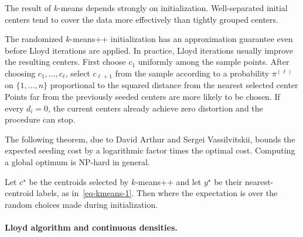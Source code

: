 The result of $k$-means depends strongly on initialization. Well-separated initial centers tend to cover the data more effectively than tightly grouped centers.

The randomized $k$-means++ initialization has an approximation guarantee even before Lloyd iterations are applied. In practice, Lloyd iterations usually improve the resulting centers. First choose $c_1$ uniformly among the sample points. After choosing $c_1,\ldots,c_\ell$, select $c_{\ell+1}$ from the sample according to a probability $\pi^{(\ell)}$ on $\{1,\ldots,n\}$ proportional to the squared distance from the nearest selected center
Points far from the previously seeded centers are more likely to be chosen. If every $d_i=0$, the current centers already achieve zero distortion and the procedure can stop.

The following theorem, due to David Arthur and Sergei Vassilvitskii, bounds the expected seeding cost by a logarithmic factor times the optimal cost. Computing a global optimum is NP-hard in general.

\begin{thm}
	Let $c^\star$ be the centroids selected by $k$-means++ and let $y^\star$ be their nearest-centroid labels, as in~\eqref{eq-kmeans-1}. Then
	where the expectation is over the random choices made during initialization.
\end{thm}




\paragraph{Lloyd algorithm and continuous densities.}

